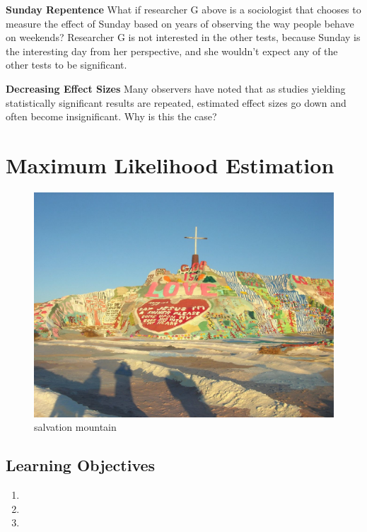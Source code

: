 \documentclass[
]{book}
\providecommand{\tightlist}{%
  \setlength{\itemsep}{0pt}\setlength{\parskip}{0pt}}
\theoremstyle{definition}
\theoremstyle{definition}
\theoremstyle{definition}
\theoremstyle{definition}
\theoremstyle{remark}
\begin{document}
\textbf{Sunday Repentence}
What if researcher G above is a sociologist that chooses to measure the effect of Sunday based on years of observing the way people behave on weekends? Researcher G is not interested in the other tests, because Sunday is the interesting day from her perspective, and she wouldn't expect any of the other tests to be significant.

\textbf{Decreasing Effect Sizes}
Many observers have noted that as studies yielding statistically significant results are repeated, estimated effect sizes go down and often become insignificant. Why is this the case?

\hypertarget{maximum-likelihood-estimation}{%
\chapter{Maximum Likelihood Estimation}\label{maximum-likelihood-estimation}}

\begin{figure}
\centering
\includegraphics{./images/salvation_mountain.jpg}
\caption{salvation mountain}
\end{figure}

\hypertarget{learning-objectives-13}{%
\section{Learning Objectives}\label{learning-objectives-13}}

\begin{enumerate}
\def\labelenumi{\arabic{enumi}.}
\tightlist
\item
\item
\item
\end{enumerate}
\end{document}
